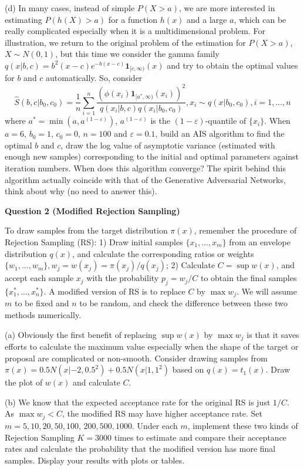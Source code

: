 \documentclass[12pt]{article}
\begin{document}
(d) In many cases, instead of simple $P(X>a)$, we are more interested in estimating $P(h(X)>a)$ for a function $h(x)$ and a large $a$, which can be really complicated especially when it is a multidimensional problem. For illustration, we return to the original problem of the estimation for $P(X>a)$, $X\sim N(0, 1)$, but this time we consider the gamma family $q(x|b,c)=b^2(x-c)e^{-b(x-c)}\mathbf{1}_{[c,\infty)}(x)$ and try to obtain the optimal values for $b$ and $c$ automatically. So, consider
$$
\hat{S}(b,c|b_0,c_0)=\frac{1}{n}\sum_{i=1}^n\frac{(\phi(x_i)\mathbf{1}_{[a^*,\infty)}(x_i))^2}{q(x_i|b,c)q(x_i|b_0,c_0)}, x_i\sim q(x|b_0,c_0), i=1,\dots,n
$$
where $a^*=\min(a, a^{(1-\varepsilon)})$, $a^{(1-\varepsilon)}$ is the $(1-\varepsilon)$-quantile of $\{x_i\}$. When $a=6$, $b_0=1$, $c_0=0$, $n=100$ and $\varepsilon=0.1$, build an AIS algorithm to find the optimal $b$ and $c$, draw the log value of asymptotic variance (estimated with enough new samples) corresponding to the initial and optimal parameters against iteration numbers. When does this algorithm converge? The spirit behind this algorithm actually coincide with that of the Generative Adversarial Networks, think about why (no need to answer this). 

\textbf{Question 2 (Modified Rejection Sampling)}

To draw samples from the target distribution $\pi(x)$, remember the procedure of Rejection Sampling (RS): 1) Draw initial samples $\{x_1,\dots,x_m\}$ from an envelope distribution $q(x)$, and calculate the corresponding ratios or weights $\{w_1,...,w_m\},w_j=w(x_j)=\pi(x_j)/q(x_j)$; 2) Calculate $C=\sup w(x)$, and accept each sample $x_j$ with the probability $p_j=w_j/C$ to obtain the final samples $\{x_1^*,\dots,x_n^*\}$. A modified version of RS is to replace $C$ by $\max w_j$. We will assume $m$ to be fixed and $n$ to be random, and check the difference between these two methods numerically. 

(a) Obviously the first benefit of replacing $\sup w(x)$ by $\max w_j$ is that it saves efforts to calculate the maximum value especially when the shape of the target or proposal are complicated or non-smooth. Consider drawing samples from $\pi(x)=0.5N(x|-2,0.5^2)+0.5N(x|1,1^2)$ based on $q(x)=t_1(x)$. Draw the plot of $w(x)$ and calculate $C$. 

(b) We know that the expected acceptance rate for the original RS is just $1/C$. As $\max w_j<C$, the modified RS may have higher acceptance rate. Set $m=5, 10, 20, 50, 100$, $200, 500, 1000$. Under each $m$, implement these two kinds of Rejection Sampling $K=3000$ times to estimate and compare their acceptance rates and calculate the probability that the modified version has more final samples. Display your results with plots or tables. 
\end{document}
